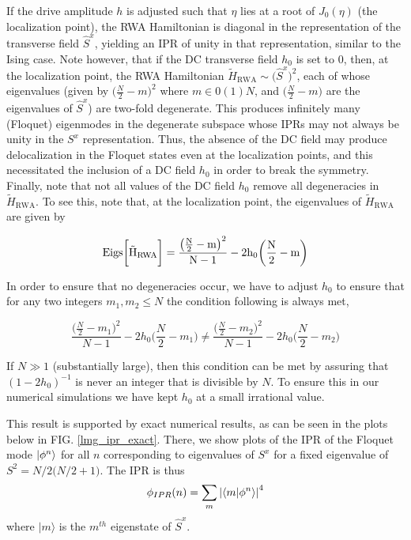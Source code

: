 \documentclass[%
reprint,
superscriptaddress,
amsmath,amssymb,
aps,
prb,
]{revtex4-2}
\begin{document}
	
	If the drive amplitude $h$ is adjusted such that $\eta$ lies at a root of $J_0(\eta)$ (the localization point), the RWA Hamiltonian is diagonal in the representation of the transverse field $\hat{S}^x$, yielding an IPR of unity in that representation, similar to the Ising case. Note however, that if the DC transverse field $h_0$ is set to $0$, then, at the localization point, the RWA Hamiltonian $\tilde{H}_{\mathrm{RWA}}\sim
	\big(\hat{S}^x\big)^2$, each of whose eigenvalues (given by $\big(\frac{N}{2}-m\big)^2$ where $m \in 0(1)N$, and $\big(\frac{N}{2}-m\big)$  are the eigenvalues of $\hat{S}^x$) are two-fold degenerate. This produces infinitely many (Floquet) eigenmodes in the degenerate subspace whose IPRs may not always be unity in the $S^x$ representation. Thus, the absence of the DC field may produce delocalization in the Floquet states even at the localization points, and this necessitated the inclusion of a DC field $h_0$ in order to break the symmetry.
	Finally, note that not all values of the DC field $h_0$ remove all degeneracies in $\tilde{H}_{\mathrm{RWA}}$. To see this, note that, at the localization point, the eigenvalues of $\tilde{H}_{\mathrm{RWA}}$ are given by
	
	\begin{equation}
	\rm{Eigs}\bigg[\tilde{H}_{\mathrm{RWA}}\bigg] = \frac{\big(\frac{N}{2}-m\big)^2}{N-1} - 2h_0 \bigg(\frac{N}{2}-m\bigg)
	\end{equation}
	
	In order to ensure that no degeneracies occur, we have to adjust $h_0$ to ensure that for any two integers $m_1, m_2 \leq N$  the condition following is always met,
	
	\begin{equation}
	\frac{\big(\frac{N}{2}-m_1\big)^2}{N-1} - 2h_0 \bigg(\frac{N}{2}-m_1\bigg) \neq \frac{\big(\frac{N}{2}-m_2\big)^2}{N-1} - 2h_0 \bigg(\frac{N}{2}-m_2\bigg)
	\end{equation}
	
	If $N\gg 1$ (substantially large), then this condition can be met by assuring that $(1-2h_0)^{-1}$ is never an integer that is divisible by $N$. To ensure this in our numerical simulations we have kept $h_0$ at a small irrational value.
	
	
	This result is supported by exact numerical results, as can be seen in the plots below in FIG. \ref{lmg_ipr_exact}. There, we show plots of the IPR of the Floquet mode $\ket{\phi^n}$ for all $n$ corresponding to eigenvalues of $S^x$ for a fixed eigenvalue of $S^2 = N/2\big(N/2 + 1\big)$. The IPR is thus
	\begin{equation}
	\phi_{IPR}(n) = \sum_m \abs{\ip{m}{\phi^n}}^4
	\label{iprlmg}
	\end{equation}
	where $|m\rangle$ is the $m^{th}$ eigenstate of $\hat{S}^x$.
	
\end{document}
